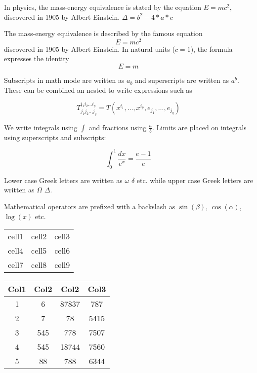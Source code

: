 \documentclass[12pt]{article}
\begin{document}
In physics, the mass-energy equivalence is stated 
by the equation $E=mc^2$, discovered in 1905 by Albert Einstein.\newline
$\Delta = b^2 - 4*a*c$


The mass-energy equivalence is described by the famous equation
\[ E=mc^2 \]
discovered in 1905 by Albert Einstein. 
In natural units ($c = 1$), the formula expresses the identity
\begin{equation}
E=m
\end{equation}

Subscripts in math mode are written as $a_b$ and superscripts are written as $a^b$. These can be combined an nested to write expressions such as

\[ T^{i_1 i_2 \dots i_p}_{j_1 j_2 \dots j_q} = T(x^{i_1},\dots,x^{i_p},e_{j_1},\dots,e_{j_q}) \]
 
We write integrals using $\int$ and fractions using $\frac{a}{b}$. Limits are placed on integrals using superscripts and subscripts:

\[ \int_0^1 \frac{dx}{e^x} =  \frac{e-1}{e} \]

Lower case Greek letters are written as $\omega$ $\delta$ etc. while upper case Greek letters are written as $\Omega$ $\Delta$.

Mathematical operators are prefixed with a backslash as $\sin(\beta)$, $\cos(\alpha)$, $\log(x)$ etc.

\begin{center}
    \begin{tabular}{|c |c |c|}
        \hline
        cell1 & cell2 & cell3 \\ 
        cell4 & cell5 & cell6 \\  
        cell7 & cell8 & cell9 \\
        \hline
    \end{tabular}
\end{center}

\begin{center}
 \begin{tabular}{|c c c c|} 
 \hline
 Col1 & Col2 & Col2 & Col3 \\ [0.5ex] 
 \hline\hline
 1 & 6 & 87837 & 787 \\ 
 \hline
 2 & 7 & 78 & 5415 \\
 \hline
 3 & 545 & 778 & 7507 \\
 \hline
 4 & 545 & 18744 & 7560 \\
 \hline
 5 & 88 & 788 & 6344 \\ [1ex] 
 \hline
\end{tabular}
\end{center}
\end{document}
